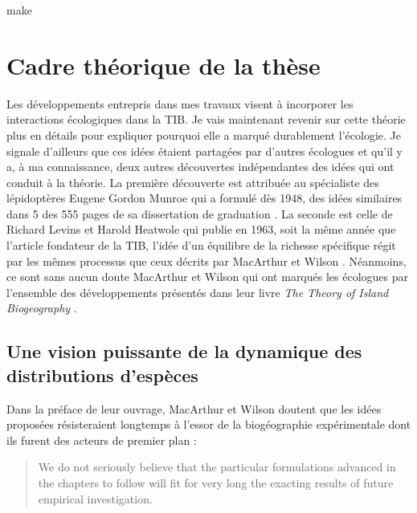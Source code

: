 make

\section*{Cadre théorique de la
thèse}\label{cadre-thuxe9orique-de-la-thuxe8se}

Les développements entrepris dans mes travaux visent à incorporer les
interactions écologiques dans la TIB. Je vais maintenant revenir sur
cette théorie plus en détails pour expliquer pourquoi elle a marqué
durablement l'écologie. Je signale d'ailleurs que ces idées étaient
partagées par d'autres écologues et qu'il y a, à ma connaissance, deux
autres découvertes indépendantes des idées qui ont conduit à la théorie.
La première découverte est attribuée au spécialiste des lépidoptères
Eugene Gordon Munroe qui a formulé dès 1948, des idées similaires dans 5
des 555 pages de sa dissertation de graduation
\citep{Brown1989, Lomolino2009}. La seconde est celle de Richard Levins
et Harold Heatwole qui publie en 1963, soit la même année que l'article
fondateur de la TIB, l'idée d'un équilibre de la richesse spécifique
régit par les mêmes processus que ceux décrits par MacArthur et Wilson
\citep{Levins1963}. Néanmoins, ce sont sans aucun doute MacArthur et
Wilson qui ont marqués les écologues par l'ensemble des développements
présentés dans leur livre \emph{The Theory of Island Biogeography}
\citep{MacArthur1967a}.

\subsection*{Une vision puissante de la dynamique des distributions
d'espèces}\label{une-vision-puissante-de-la-dynamique-des-distributions-despuxe8ces}

Dans la préface de leur ouvrage, MacArthur et Wilson doutent que les
idées proposées résisteraient longtemps à l'essor de la biogéographie
expérimentale dont ils furent des acteurs de premier plan :

\begin{quote}
We do not seriously believe that the particular formulations advanced in
the chapters to follow will fit for very long the exacting results of
future empirical investigation.
\end{quote}

